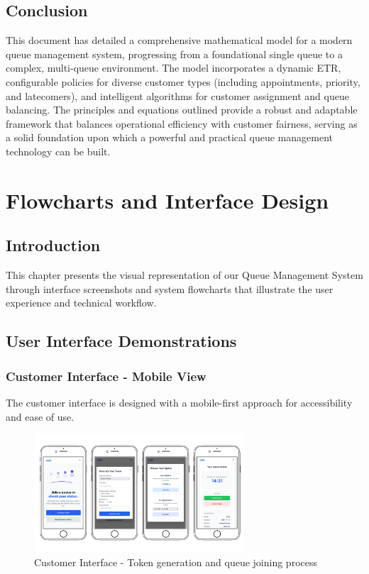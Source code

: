 \documentclass[12pt,a4paper]{report}
\begin{document}
\section{Conclusion}
This document has detailed a comprehensive mathematical model for a modern queue management system, progressing from a foundational single queue to a complex, multi-queue environment. The model incorporates a dynamic ETR, configurable policies for diverse customer types (including appointments, priority, and latecomers), and intelligent algorithms for customer assignment and queue balancing. The principles and equations outlined provide a robust and adaptable framework that balances operational efficiency with customer fairness, serving as a solid foundation upon which a powerful and practical queue management technology can be built.

\newpage
\chapter{Flowcharts and Interface Design}

\section{Introduction}

This chapter presents the visual representation of our Queue Management System through interface screenshots and system flowcharts that illustrate the user experience and technical workflow.

\section{User Interface Demonstrations}

\subsection{Customer Interface - Mobile View}

The customer interface is designed with a mobile-first approach for accessibility and ease of use.

\begin{figure}[h]
    \centering
    \includegraphics[width=0.7\textwidth]{screenshot(1).png}
    \caption{Customer Interface - Token generation and queue joining process}
    \label{fig:customer_interface}
\end{figure}
\end{document}
